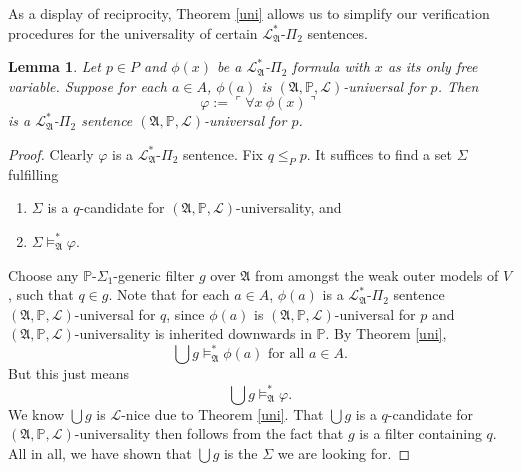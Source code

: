 \documentclass[12pt, twoside]{memoir}
\numberwithin{equation}{section}
\newtheorem{lem}[thm]{Lemma}
\theoremstyle{definition}
\theoremstyle{remark}
\theoremstyle{definition}
\theoremstyle{definition}
\theoremstyle{definition}
\theoremstyle{remark}
\begin{document}
As a display of reciprocity, Theorem \ref{uni} allows us to simplify our verification procedures for the universality of certain $\mathcal{L}^{*}_{\mathfrak{A}}$-$\Pi_2$ sentences. 

\begin{lem}\label{univer}
Let $p \in P$ and $\phi(x)$ be a $\mathcal{L}^{*}_{\mathfrak{A}}$-$\Pi_2$ formula with $x$ as its only free variable. Suppose for each $a \in A$, $\phi(a)$ is $(\mathfrak{A}, \mathbb{P}, \mathcal{L})$-universal for $p$. Then
\begin{equation*}
    \varphi := \ulcorner \forall x \ \phi(x) \urcorner
\end{equation*}
is a $\mathcal{L}^{*}_{\mathfrak{A}}$-$\Pi_2$ sentence $(\mathfrak{A}, \mathbb{P}, \mathcal{L})$-universal for $p$.
\end{lem}
\begin{proof}
Clearly $\varphi$ is a $\mathcal{L}^{*}_{\mathfrak{A}}$-$\Pi_2$ sentence. Fix $q \leq_P p$. It suffices to find a set $\Sigma$ fulfilling
\begin{enumerate}[label=(\alph*)]
    \item $\Sigma$ is a $q$-candidate for $(\mathfrak{A}, \mathbb{P}, \mathcal{L})$-universality, and 
    \item $\Sigma \models^{*}_{\mathfrak{A}} \varphi$.
\end{enumerate}

Choose any $\mathbb{P}$-$\Sigma_1$-generic filter $g$ over $\mathfrak{A}$ from amongst the weak outer models of $V$, such that $q \in g$. Note that for each $a \in A$, $\phi(a)$ is a $\mathcal{L}^{*}_{\mathfrak{A}}$-$\Pi_2$ sentence $(\mathfrak{A}, \mathbb{P}, \mathcal{L})$-universal for $q$, since $\phi(a)$ is $(\mathfrak{A}, \mathbb{P}, \mathcal{L})$-universal for $p$ and $(\mathfrak{A}, \mathbb{P}, \mathcal{L})$-universality is inherited downwards in $\mathbb{P}$. By Theorem \ref{uni},
\begin{equation*}
    \bigcup g \models^{*}_{\mathfrak{A}} \phi(a) \text{ for all } a \in A \text{.}
\end{equation*}
But this just means 
\begin{equation*}
    \bigcup g \models^{*}_{\mathfrak{A}} \varphi \text{.}
\end{equation*}
We know $\bigcup g$ is $\mathcal{L}$-nice due to Theorem \ref{uni}. That $\bigcup g$ is a $q$-candidate for $(\mathfrak{A}, \mathbb{P}, \mathcal{L})$-universality then follows from the fact that $g$ is a filter containing $q$. All in all, we have shown that $\bigcup g$ is the $\Sigma$ we are looking for.
\end{proof}
\end{document}
